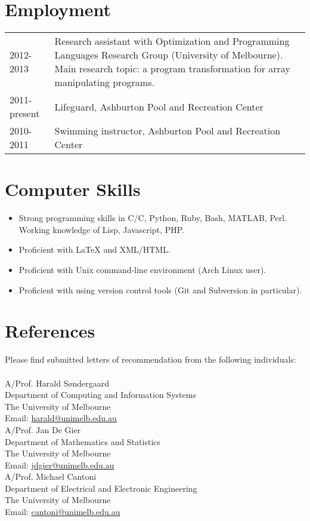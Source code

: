 \documentclass[12pt,a4paper]{article}
\newcommand{\mailto}[1]{\href{mailto:#1}{\url{#1}} }
\newcommand{\CPP}
{C\nolinebreak[4]\hspace{-.05em}\raisebox{.22ex}{\footnotesize\bf ++ }}
\newenvironment{llist}
	{\renewcommand{\arraystretch}{1.5}\begin{tabular}{p{3cm} p{12cm}}}
	{\end{tabular}}
\begin{document}
\section*{Employment}
\begin{llist}
  2012-2013 & Research assistant with Optimization and Programming Languages
  Research Group (University of Melbourne). Main research topic: a program
  transformation for array manipulating programs. \\
	2011-present & Lifeguard, Ashburton Pool and Recreation Center \\
	2010-2011 & Swimming instructor, Ashburton Pool and Recreation Center \\
\end{llist}

\section*{Computer Skills}
\begin{itemize}
  \item Strong programming skills in C/\CPP, Python, Ruby, Bash, MATLAB,
    Perl. Working knowledge of Lisp, Javascript, PHP. 
	\item Proficient with {\LaTeX} and XML/HTML.
  \item Proficient with Unix command-line environment (Arch Linux user).
  \item Proficient with using version control tools (Git and Subversion in
    particular).
\end{itemize}

\pagebreak
\section*{References}
Please find submitted letters of recommendation from the following individuals: \\ \\

\noindent
A/Prof. Harald S\o ndergaard  \\
Department of Computing and Information Systems \\
The University of Melbourne \\
Email: \mailto{harald@unimelb.edu.au} \\

\noindent
A/Prof. Jan De Gier \\
Department of Mathematics and Statistics\\
The University of Melbourne \\
Email: \mailto{jdgier@unimelb.edu.au} \\

\noindent
A/Prof. Michael Cantoni \\
Department of Electrical and Electronic Engineering \\
The University of Melbourne \\
Email: \mailto{cantoni@unimelb.edu.au}

\hfill \qedsymbol


\end{document}
